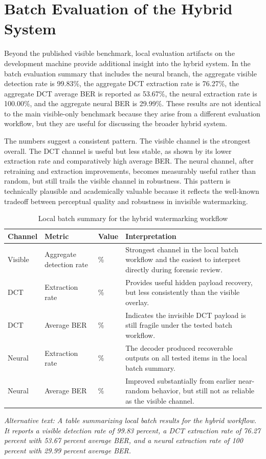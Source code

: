 \documentclass[12pt,oneside]{report}
\newcommand{\AltText}[1]{\par\small\textit{Alternative text: #1}\normalsize}
\begin{document}
\section{Batch Evaluation of the Hybrid System}
Beyond the published visible benchmark, local evaluation artifacts on the development machine provide additional insight into the hybrid system. In the batch evaluation summary that includes the neural branch, the aggregate visible detection rate is 99.83\%, the aggregate DCT extraction rate is 76.27\%, the aggregate DCT average BER is reported as 53.67\%, the neural extraction rate is 100.00\%, and the aggregate neural BER is 29.99\%. These results are not identical to the main visible-only benchmark because they arise from a different evaluation workflow, but they are useful for discussing the broader hybrid system.

The numbers suggest a consistent pattern. The visible channel is the strongest overall. The DCT channel is useful but less stable, as shown by its lower extraction rate and comparatively high average BER. The neural channel, after retraining and extraction improvements, becomes measurably useful rather than random, but still trails the visible channel in robustness. This pattern is technically plausible and academically valuable because it reflects the well-known tradeoff between perceptual quality and robustness in invisible watermarking.

\begin{table}[htbp]
\centering
\caption{Local batch summary for the hybrid watermarking workflow}
{\small
\begin{tabularx}{0.96\textwidth}{>{\raggedright\arraybackslash}p{1.0in} >{\raggedright\arraybackslash}p{1.15in} >{\raggedright\arraybackslash}p{0.85in} X}
\toprule
Channel & Metric & Value & Interpretation \\
\midrule
Visible & Aggregate detection rate & 99.83\% & Strongest channel in the local batch workflow and the easiest to interpret directly during forensic review. \\
DCT & Extraction rate & 76.27\% & Provides useful hidden payload recovery, but less consistently than the visible overlay. \\
DCT & Average BER & 53.67\% & Indicates the invisible DCT payload is still fragile under the tested batch workflow. \\
Neural & Extraction rate & 100.00\% & The decoder produced recoverable outputs on all tested items in the local batch summary. \\
Neural & Average BER & 29.99\% & Improved substantially from earlier near-random behavior, but still not as reliable as the visible channel. \\
\bottomrule
\end{tabularx}
}
\AltText{A table summarizing local batch results for the hybrid workflow. It reports a visible detection rate of 99.83 percent, a DCT extraction rate of 76.27 percent with 53.67 percent average BER, and a neural extraction rate of 100 percent with 29.99 percent average BER.}
\end{table}
\end{document}
